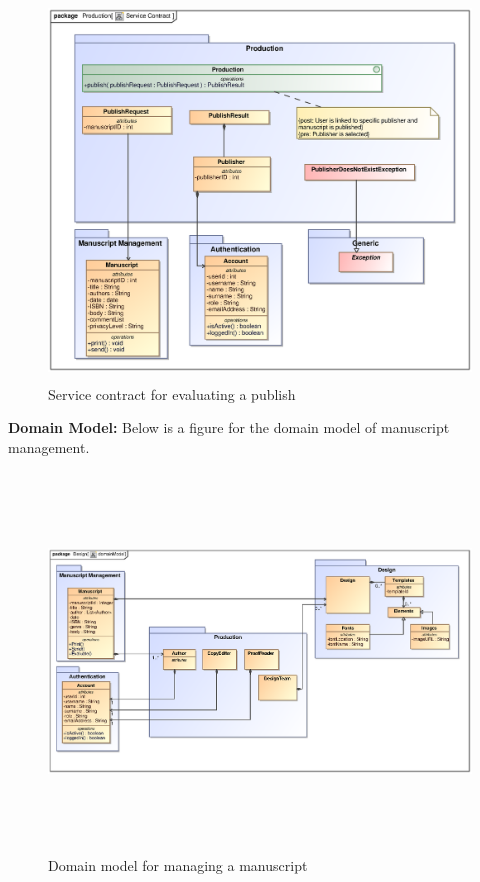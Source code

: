 \begin{enumerate}
\begin{figure}[h]
\includegraphics[height=380px, width=500px]{epsImages/Production/Publish.eps}
\caption{Service contract for evaluating a publish}
\end{figure}

 \newpage
\textbf{Domain Model:} Below is a figure for the domain model of manuscript management. 

\begin{figure}[h]
\includegraphics[height=380px, width=500px]{epsImages/DomainModels/ProductionDomainModel.eps}
\caption{Domain model for managing a manuscript}
\end{figure}


\end{enumerate}